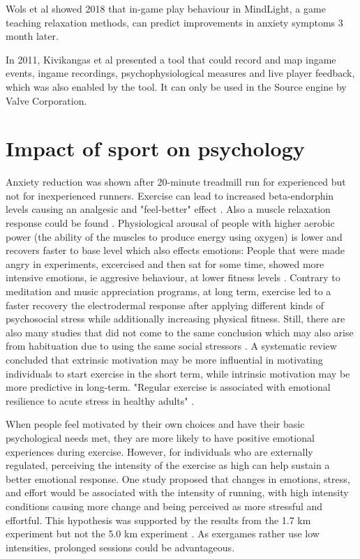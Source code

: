 Wols et al \cite{wols2018game} showed 2018 that in-game play behaviour in MindLight, a game teaching relaxation methods, can predict improvements in anxiety symptoms 3 month later.

In 2011, Kivikangas et al \cite{kivikangas2011developing} presented a tool that could record and map ingame events, ingame recordings, psychophysiological measures and live player feedback, which was also enabled by the tool. It can only be used in the Source engine by Valve Corporation.

\section{Impact of sport on psychology}
Anxiety reduction was shown after 20-minute treadmill run for experienced but not for inexperienced runners. \cite{hatfield87psychophysiology, boutcher86anxiety}
Exercise can lead to increased beta-endorphin levels causing an analgesic and "feel-better" effect \cite{hatfield87psychophysiology}. Also a muscle relaxation response could be found \cite{devries72electromyiographic, hatfield87psychophysiology}.
Physiological arousal of people with higher aerobic power (the ability of the muscles to produce energy using oxygen) is lower and recovers faster to base level which also effects emotions: People that were made angry in experiments, excercised and then sat for some time, showed more intensive emotions, ie aggresive behaviour, at lower fitness levels \cite{zillmann74attribution}.
Contrary to meditation and music appreciation programs, at long term, exercise led to a faster recovery the electrodermal response after applying different kinds of psychosocial stress \cite{keller84physical} while additionally increasing physical fitness. Still, there are also many studies that did not come to the same conclusion which may also arise from habituation due to using the same social stressors \cite{hatfield87psychophysiology}.
A systematic review concluded that extrinsic motivation may be more influential in motivating individuals to start exercise in the short term, while intrinsic motivation may be more predictive in long-term.\cite{teixeira2012exercise} 
"Regular exercise is associated with emotional resilience to acute stress in healthy adults" \cite{childs15regular}.

When people feel motivated by their own choices and have their basic psychological needs met, they are more likely to have positive emotional experiences during exercise. However, for individuals who are externally regulated, perceiving the intensity of the exercise as high can help sustain a better emotional response. \cite{teixeira16needs}
One study proposed that changes in emotions, stress, and effort would be associated with the intensity of running, with high intensity conditions causing more change and being perceived as more stressful and effortful. This hypothesis was supported by the results from the 1.7 km experiment but not the 5.0 km experiment \cite{kerr2000effects}. As exergames rather use low intensities, prolonged sessions could be advantageous. 


